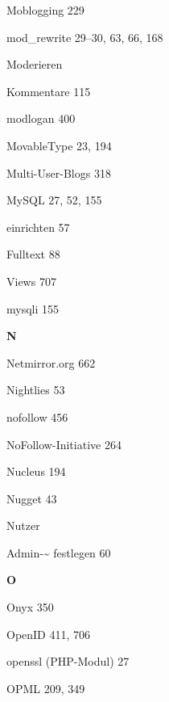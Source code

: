 \documentclass{book}
\renewcommand\indexspace{\vspace{11pt}}
\renewcommand\subitem{\par}
\begin{document}
\begin{multicols}{2}
\begin{osp-index}
  \item Moblogging\hspace{1mm} 229
  \item mod\_rewrite\hspace{1mm} 29--30, 63, 66, 168
  \item Moderieren
    \subitem Kommentare\hspace{1mm} 115
  \item modlogan\hspace{1mm} 400
  \item MovableType\hspace{1mm} 23, 194
  \item Multi-User-Blogs\hspace{1mm} 318
  \item MySQL\hspace{1mm} 27, 52, 155
    \subitem einrichten\hspace{1mm} 57
    \subitem Fulltext\hspace{1mm} 88
    \subitem Views\hspace{1mm} 707
  \item mysqli\hspace{1mm} 155

  \indexspace
{\sffamily\bfseries N}\nopagebreak

  \item Netmirror.org\hspace{1mm} 662
  \item Nightlies\hspace{1mm} 53
  \item nofollow\hspace{1mm} 456
  \item NoFollow-Initiative\hspace{1mm} 264
  \item Nucleus\hspace{1mm} 194
  \item Nugget\hspace{1mm} 43
  \item Nutzer
    \subitem Admin-\textasciitilde{} festlegen\hspace{1mm} 60

  \indexspace
{\sffamily\bfseries O}\nopagebreak

  \item Onyx\hspace{1mm} 350
  \item OpenID\hspace{1mm} 411, 706
  \item openssl (PHP-Modul)\hspace{1mm} 27
  \item OPML\hspace{1mm} 209, 349


\end{osp-index}
\end{multicols}
\end{document}
